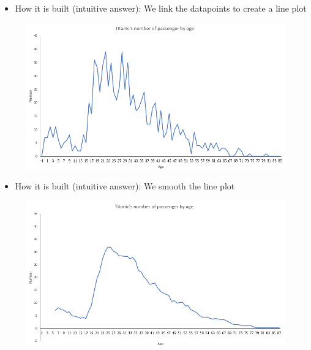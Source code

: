 \documentclass[compress]{beamer}
\begin{document}
\begin{frame}
	\begin{itemize}
		\item How it is built (intuitive answer): We link the datapoints to create a line plot
	\end{itemize}
	\begin{figure}
		\centering
		\includegraphics[scale=0.6]{Picture/Curve age titanic.PNG}
	\end{figure}
\end{frame}

\begin{frame}
	\begin{itemize}
		\item How it is built (intuitive answer): We smooth the line plot
	\end{itemize}
	\begin{figure}
		\centering
		\includegraphics[scale=0.6]{Picture/Curve age titanic smoothed.PNG}
	\end{figure}
\end{frame}
\end{document}
